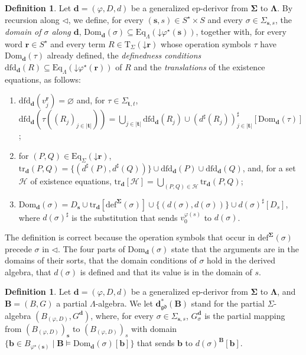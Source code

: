 \documentclass{amsart}
\newcommand{\bb}[1]{\ensuremath{\lvert #1 \rvert}}
\newcommand{\vs}[1]{\mathbin{\downarrow}#1}
\theoremstyle{plain}
\theoremstyle{definition}
\newtheorem{definition}[theorem]{Definition}
\begin{document}
\begin{definition}\label{DDomTr}
Let $\mathbf{d}=(\varphi,D,d)$ be a generalized ep-derivor from $\mathbf{\Sigma}$ to $\mathbf{\Lambda}$. By recursion along $\lhd$, we define, for every $(\mathbf{s},s)\in S^{\star}\times S$ and every $\sigma\in\Sigma_{\mathbf{s},s}$, the \emph{domain of $\sigma$ along $\mathbf{d}$}, $\mathrm{Dom}_{\mathbf{d}}(\sigma)\subseteq\mathrm{Eq}_{\Lambda}(\vs{\varphi^{\star}(\mathbf{s})})$, together with, for every word $\mathbf{r}\in S^{\star}$ and every term $R\in\mathrm{T}_{\Sigma}(\vs{\mathbf{r}})$ whose operation symbols $\tau$ have $\mathrm{Dom}_{\mathbf{d}}(\tau)$ already defined, the \emph{definedness conditions} $\mathrm{dfd}_{\mathbf{d}}(R)\subseteq\mathrm{Eq}_{\Lambda}(\vs{\varphi^{\star}(\mathbf{r})})$ of $R$ and the \emph{translations} of the existence equations, as follows:
\begin{enumerate}
\item $\mathrm{dfd}_{\mathbf{d}}(v^{\mathbf{r}}_{j})=\varnothing$ and, for $\tau\in\Sigma_{\mathbf{t},t}$, $\mathrm{dfd}_{\mathbf{d}}(\tau((R_{j})_{j\in\bb{\mathbf{t}}}))=\bigcup_{j\in\bb{\mathbf{t}}}\mathrm{dfd}_{\mathbf{d}}(R_{j})\cup(d^{\sharp}(R_{j}))^{\sharp}_{j\in\bb{\mathbf{t}}}[\mathrm{Dom}_{\mathbf{d}}(\tau)]$;
\item for $(P,Q)\in\mathrm{Eq}_{\Sigma}(\vs{\mathbf{r}})$, $\mathrm{tr}_{\mathbf{d}}(P,Q)=\{(d^{\sharp}(P),d^{\sharp}(Q))\}\cup\mathrm{dfd}_{\mathbf{d}}(P)\cup\mathrm{dfd}_{\mathbf{d}}(Q)$, and, for a set $\mathcal{H}$ of existence equations, $\mathrm{tr}_{\mathbf{d}}[\mathcal{H}]=\bigcup_{(P,Q)\in\mathcal{H}}\mathrm{tr}_{\mathbf{d}}(P,Q)$;
\item $\mathrm{Dom}_{\mathbf{d}}(\sigma)=D_{\mathbf{s}}\cup\mathrm{tr}_{\mathbf{d}}[\mathrm{def}^{\mathbf{\Sigma}}(\sigma)]\cup\{(d(\sigma),d(\sigma))\}\cup d(\sigma)^{\sharp}[D_{s}]$, where $d(\sigma)^{\sharp}$ is the substitution that sends $v^{\varphi(s)}_{0}$ to $d(\sigma)$.
\end{enumerate}
\end{definition}

The definition is correct because the operation symbols that occur in $\mathrm{def}^{\mathbf{\Sigma}}(\sigma)$ precede $\sigma$ in $\lhd$. The four parts of $\mathrm{Dom}_{\mathbf{d}}(\sigma)$ state that the arguments are in the domains of their sorts, that the domain conditions of $\sigma$ hold in the derived algebra, that $d(\sigma)$ is defined and that its value is in the domain of $s$.

\begin{definition}\label{DDerivedPAlg}
Let $\mathbf{d}=(\varphi,D,d)$ be a generalized ep-derivor from $\mathbf{\Sigma}$ to $\mathbf{\Lambda}$, and $\mathbf{B}=(B,G)$ a partial $\Lambda$-algebra. We let $\mathbf{d}^{\ast}_{\mathfrak{gd}}(\mathbf{B})$ stand for the partial $\Sigma$-algebra $(B_{(\varphi,D)},G^{\mathbf{d}})$, where, for every $\sigma\in\Sigma_{\mathbf{s},s}$, $G^{\mathbf{d}}_{\sigma}$ is the partial mapping from $(B_{(\varphi,D)})_{\mathbf{s}}$ to $(B_{(\varphi,D)})_{s}$ with domain $\{\mathbf{b}\in B_{\varphi^{\star}(\mathbf{s})}\mid\mathbf{B}\models\mathrm{Dom}_{\mathbf{d}}(\sigma)[\mathbf{b}]\}$ that sends $\mathbf{b}$ to $d(\sigma)^{\mathbf{B}}[\mathbf{b}]$.
\end{definition}
\end{document}
